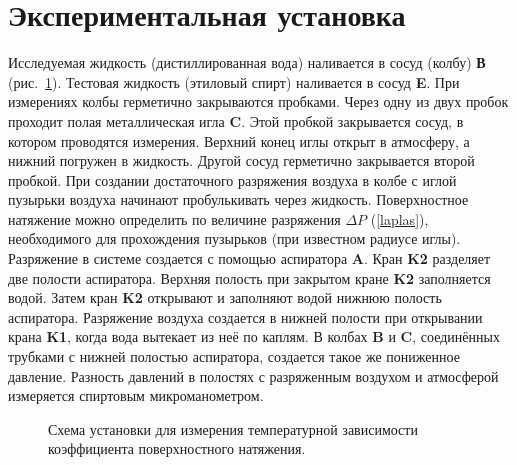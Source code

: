 \documentclass[a4paper,12pt]{article} %
\begin{document}
\section{Экспериментальная установка}
	Исследуемая жидкость (дистиллированная вода) наливается в сосуд (колбу) \textbf{В} (рис.~\ref{ris:ustanovka}). Тестовая жидкость  (этиловый спирт) наливается  в сосуд \textbf{E}. При измерениях  колбы герметично закрываются  пробками.   Через одну из двух пробок  проходит полая металлическая игла \textbf{C}. Этой пробкой закрывается сосуд, в котором  проводятся измерения. Верхний конец иглы открыт в атмосферу, а нижний погружен в жидкость. Другой сосуд герметично закрывается второй пробкой. При создании достаточного  разряжения воздуха в колбе с иглой пузырьки воздуха начинают пробулькивать через жидкость. Поверхностное натяжение можно определить по величине разряжения $\Delta P$ (\ref{laplas}), необходимого для прохождения пузырьков (при известном радиусе иглы).\\
	Разряжение в системе создается с помощью аспиратора \textbf{A}. Кран \textbf{K2} разделяет две полости аспиратора. Верхняя полость при закрытом кране \textbf{K2}  заполняется водой. Затем кран \textbf{K2} открывают и заполняют водой  нижнюю полость  аспиратора.  Разряжение воздуха создается в нижней полости  при открывании крана \textbf{K1}, когда  вода вытекает из неё по каплям. В колбах \textbf{B} и \textbf{C}, соединённых трубками с нижней полостью аспиратора,  создается такое же пониженное давление. Разность давлений в полостях с разряженным воздухом и атмосферой измеряется спиртовым микроманометром.
	\begin{figure}[H]
		\caption{Схема установки для измерения температурной зависимости коэффициента поверхностного натяжения.}
		\label{ris:ustanovka}
	\end{figure}
\end{document}
